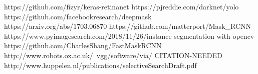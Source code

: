 \begin{thebibliography}{20}%



 https://github.com/fizyr/keras-retinanet
 https://pjreddie.com/darknet/yolo
 https://github.com/facebookresearch/deepmask
 https://arxiv.org/abs/1703.06870
 https://github.com/matterport/Mask\_RCNN
 https://www.pyimagesearch.com/2018/11/26/instance-segmentation-with-opencv
 https://github.com/CharlesShang/FastMaskRCNN
 http://www.robots.ox.ac.uk/~vgg/software/via/
 CITATION-NEEDED
 http://www.huppelen.nl/publications/selectiveSearchDraft.pdf

\end{thebibliography}

